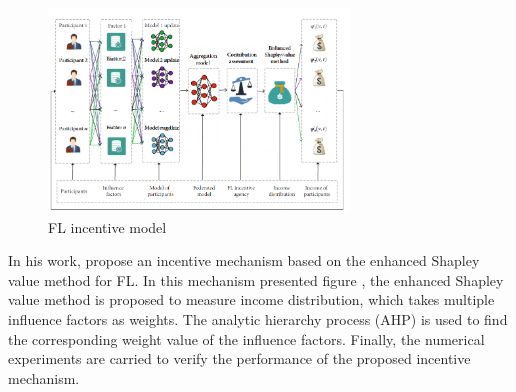 \documentclass{article}
\begin{document}
\begin{figure}[!ht]
    \centering
    \includegraphics[width=8cm]{assets/incentiveGraph.PNG}
    \caption{FL incentive model}
    \label{fig:incentive_graph}
\end{figure}
\newline \newline In his work, \cite{Weijie_Tan} propose an incentive mechanism based on the enhanced Shapley value method for FL. In this mechanism presented figure \cite{fig:incentive_graph}, the enhanced Shapley value method is proposed to measure income distribution, which takes multiple influence factors as weights. The analytic hierarchy process (AHP) is used to find the corresponding weight value of the influence factors. Finally, the numerical experiments are carried to verify the performance of the proposed incentive mechanism. 




\end{document}

